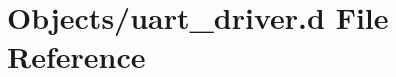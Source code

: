 \hypertarget{uart__driver_8d}{}\section{Objects/uart\+\_\+driver.d File Reference}
\label{uart__driver_8d}
